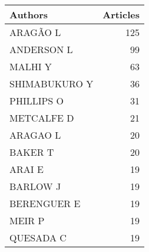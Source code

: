 
\begin{tabular}{lr}
\toprule
Authors & Articles\\
\midrule
ARAGÃO L & 125\\
ANDERSON L & 99\\
MALHI Y & 63\\
SHIMABUKURO Y & 36\\
PHILLIPS O & 31\\
\addlinespace
METCALFE D & 21\\
ARAGAO L & 20\\
BAKER T & 20\\
ARAI E & 19\\
BARLOW J & 19\\
\addlinespace
BERENGUER E & 19\\
MEIR P & 19\\
QUESADA C & 19\\
\bottomrule
\end{tabular}